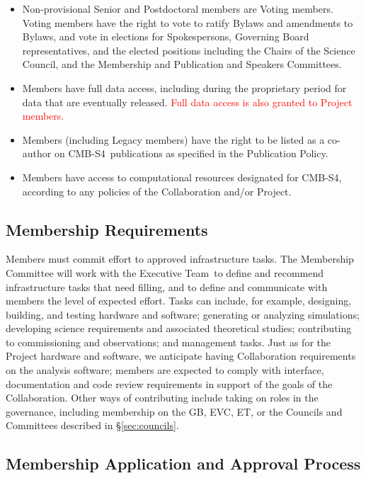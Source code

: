 \documentclass[12pt]{article}
\newcommand{\exec}{{Executive Team}}
\newcommand\collabname{CMB-S4}
\begin{document}
\begin{itemize}

\item Non-provisional Senior and Postdoctoral members are Voting members.  Voting members have the right to vote to ratify Bylaws and amendments to Bylaws, and vote in elections for Spokespersons, Governing Board representatives, and the elected positions including the Chairs of the Science Council, and the Membership and Publication and Speakers Committees. 

\item Members have full data access, including during the proprietary period for data that are eventually released. \textcolor{red}{Full data access is also granted to Project members.}

\item Members (including Legacy members) have the right to be listed as a co-author on \collabname\ publications as specified in the Publication Policy.

\item Members have access to computational resources designated for \collabname, according to any policies of the Collaboration and/or Project.

\end{itemize}

\subsection{Membership Requirements}

Members must commit effort to approved infrastructure tasks. The Membership Committee will work with the \exec\ to define and recommend infrastructure tasks that need filling, and to define and communicate with members the level of expected effort. Tasks can include, for example, designing, building, and testing hardware and software; generating or analyzing simulations; developing science requirements and associated theoretical studies; contributing to commissioning and observations; and management tasks. Just as for the Project hardware and software, we anticipate having Collaboration requirements on the analysis software; members are expected to comply with interface, documentation and code review requirements in support of the goals of the Collaboration. Other ways of contributing include taking on roles in the governance, including membership on the GB, EVC, ET, or the Councils and Committees described in \S\ref{sec:councils}.

\subsection{Membership Application and Approval Process}
\end{document}
